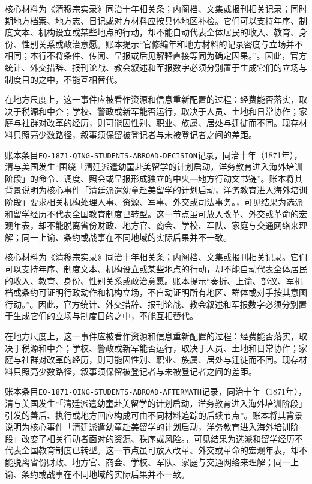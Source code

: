 核心材料为《清穆宗实录》同治十年相关条；内阁档、文集或报刊相关记录；同时期地方档案、地方志、日记或对方材料应按具体地区补检。它们可以支持年序、制度文本、机构设立或某些地点的行动，却不能自动代表全体居民的收入、教育、身份、性别关系或政治意愿。账本提示“官修编年和地方材料的记录密度与立场并不相同；本行不将条件、传闻、呈报或后见解释直接等同为确定因果。”。因此，官方统计、外交措辞、报刊论战、教会叙述和军报数字必须分别置于生成它们的立场与制度目的之中，不能互相替代。

在地方尺度上，这一事件应被看作资源和信息重新配置的过程：经费能否落实，取决于税源和中介；学校、警政或新军能否运行，取决于人员、土地和日常协作；家庭与社群对改革的经历，则可能因性别、职业、族属、居处与迁徙而不同。现存材料只照亮少数路径，叙事须保留被登记者与未被登记者之间的差距。

账本条目\texttt{EQ-1871-QING-STUDENTS-ABROAD-DECISION}记录，同治十年（1871年），清与美国发生“围绕「清廷派遣幼童赴美留学的计划启动，洋务教育进入海外培训阶段」的命令、调度、照会或呈报形成独立的中央—地方行动文书链”。账本将其背景说明为核心事件「清廷派遣幼童赴美留学的计划启动，洋务教育进入海外培训阶段」要求相关机构处理人事、资源、军事、外交或司法事务。，可见结果为选派和留学经历不代表全国教育制度已转型。这一节点虽可放入改革、外交或革命的宏观年表，却不能脱离省份财政、地方官、商会、学校、军队、家庭与交通网络来理解；同一上谕、条约或战事在不同地域的实际后果并不一致。

核心材料为《清穆宗实录》同治十年相关条；内阁档、文集或报刊相关记录。它们可以支持年序、制度文本、机构设立或某些地点的行动，却不能自动代表全体居民的收入、教育、身份、性别关系或政治意愿。账本提示“奏折、上谕、部议、军机档或条约可证明行政动作和机构立场，不自动证明所有地区、群体或对手按其意图行动。”。因此，官方统计、外交措辞、报刊论战、教会叙述和军报数字必须分别置于生成它们的立场与制度目的之中，不能互相替代。

在地方尺度上，这一事件应被看作资源和信息重新配置的过程：经费能否落实，取决于税源和中介；学校、警政或新军能否运行，取决于人员、土地和日常协作；家庭与社群对改革的经历，则可能因性别、职业、族属、居处与迁徙而不同。现存材料只照亮少数路径，叙事须保留被登记者与未被登记者之间的差距。

账本条目\texttt{EQ-1871-QING-STUDENTS-ABROAD-AFTERMATH}记录，同治十年（1871年），清与美国发生“「清廷派遣幼童赴美留学的计划启动，洋务教育进入海外培训阶段」引发的善后、执行或地方回应构成可由不同材料追踪的后续节点”。账本将其背景说明为核心事件「清廷派遣幼童赴美留学的计划启动，洋务教育进入海外培训阶段」改变了相关行动者面对的资源、秩序或风险。，可见结果为选派和留学经历不代表全国教育制度已转型。这一节点虽可放入改革、外交或革命的宏观年表，却不能脱离省份财政、地方官、商会、学校、军队、家庭与交通网络来理解；同一上谕、条约或战事在不同地域的实际后果并不一致。

